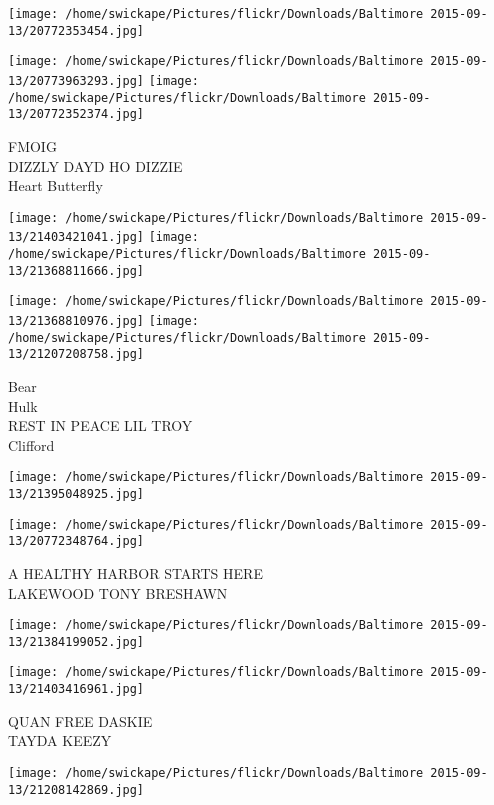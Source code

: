 \documentclass[10pt,letterpaper]{article}
\begin{document}
\texttt{[image: /home/swickape/Pictures/flickr/Downloads/Baltimore 2015-09-13/20772353454.jpg]}

\vspace{0.25in}
\texttt{[image: /home/swickape/Pictures/flickr/Downloads/Baltimore 2015-09-13/20773963293.jpg]}
\texttt{[image: /home/swickape/Pictures/flickr/Downloads/Baltimore 2015-09-13/20772352374.jpg]}

FMOIG\\
DIZZLY DAYD HO DIZZIE\\
Heart Butterfly\\
\pagebreak

\texttt{[image: /home/swickape/Pictures/flickr/Downloads/Baltimore 2015-09-13/21403421041.jpg]}
\texttt{[image: /home/swickape/Pictures/flickr/Downloads/Baltimore 2015-09-13/21368811666.jpg]}

\texttt{[image: /home/swickape/Pictures/flickr/Downloads/Baltimore 2015-09-13/21368810976.jpg]}
\texttt{[image: /home/swickape/Pictures/flickr/Downloads/Baltimore 2015-09-13/21207208758.jpg]}

Bear\\
Hulk\\
REST IN PEACE LIL TROY\\
Clifford\\
\pagebreak

\texttt{[image: /home/swickape/Pictures/flickr/Downloads/Baltimore 2015-09-13/21395048925.jpg]}

\vspace{0.25in}
\texttt{[image: /home/swickape/Pictures/flickr/Downloads/Baltimore 2015-09-13/20772348764.jpg]}

A HEALTHY HARBOR STARTS HERE\\
LAKEWOOD TONY BRESHAWN\\
\pagebreak

\texttt{[image: /home/swickape/Pictures/flickr/Downloads/Baltimore 2015-09-13/21384199052.jpg]}

\vspace{0.25in}
\texttt{[image: /home/swickape/Pictures/flickr/Downloads/Baltimore 2015-09-13/21403416961.jpg]}

QUAN FREE DASKIE\\
TAYDA KEEZY\\
\pagebreak

\texttt{[image: /home/swickape/Pictures/flickr/Downloads/Baltimore 2015-09-13/21208142869.jpg]}
\end{document}
